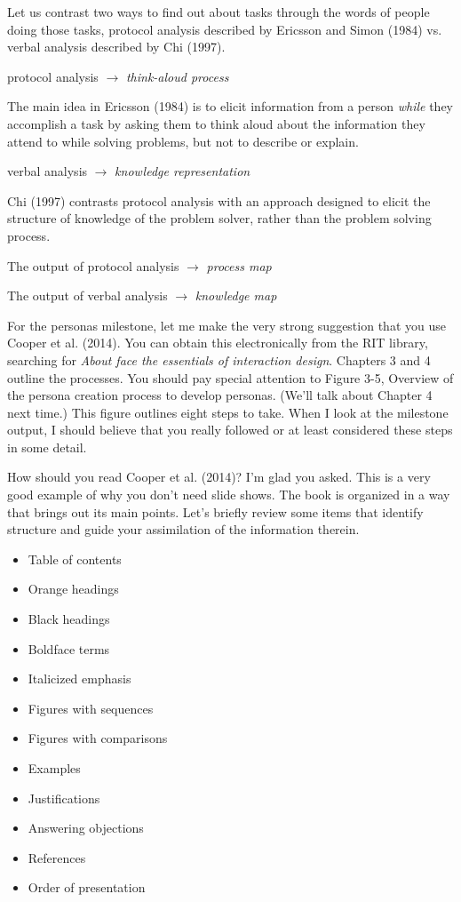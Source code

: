 \hypertarget{protocol-and-verbal-analysis}{%
\label{protocol-and-verbal-analysis}}

Let us contrast two ways to find out about tasks through the words of
people doing those tasks, protocol analysis described by Ericsson and
Simon (1984) vs. verbal analysis described by Chi (1997).

protocol analysis \(\rightarrow\) \emph{think-aloud process}

The main idea in Ericsson (1984) is to elicit information from a person
\emph{while} they accomplish a task by asking them to think aloud about
the information they attend to while solving problems, but not to
describe or explain.

verbal analysis \(\rightarrow\) \emph{knowledge representation}

Chi (1997) contrasts protocol analysis with an approach designed to
elicit the structure of knowledge of the problem solver, rather than the
problem solving process.

The output of protocol analysis \(\rightarrow\) \emph{process map}

The output of verbal analysis \(\rightarrow\) \emph{knowledge map}

\hypertarget{personas-and-scenarios}{%
\label{personas-and-scenarios}}

For the personas milestone, let me make the very strong suggestion that
you use Cooper et al. (2014). You can obtain this electronically from
the RIT library, searching for \emph{About face the essentials of
interaction design}. Chapters 3 and 4 outline the processes. You should
pay special attention to Figure 3-5, Overview of the persona creation
process to develop personas. (We'll talk about Chapter 4 next time.)
This figure outlines eight steps to take. When I look at the milestone
output, I should believe that you really followed or at least considered
these steps in some detail.

How should you read Cooper et al. (2014)? I'm glad you asked. This is a
very good example of why you don't need slide shows. The book is
organized in a way that brings out its main points. Let's briefly review
some items that identify structure and guide your assimilation of the
information therein.

\begin{itemize}
\tightlist
\item
  Table of contents
\item
  Orange headings
\item
  Black headings
\item
  Boldface terms
\item
  Italicized emphasis
\item
  Figures with sequences
\item
  Figures with comparisons
\item
  Examples
\item
  Justifications
\item
  Answering objections
\item
  References
\item
  Order of presentation
\end{itemize}

